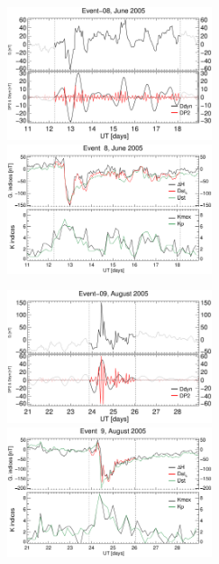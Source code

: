 \documentclass[a4paper,fleqn]{cas-dc}
\begin{document}
\begin{figure}[h!]
     \centerline{\Large \bf   
      \hspace{0.275\textwidth}  \color{black}{}
       \hspace{0.295\textwidth}  \color{black}{}
         \hfill}
	\includegraphics[width=6.0cm]{images/diono/iono_PI_V1_2005-06-11.eps}     
	\includegraphics[width=6.0cm]{images/dH_approx/diono_valid_V4_2005-06-11.eps}     
       \centerline{\Large \bf   
      \hspace{0.275\textwidth}  \color{black}{}
       \hspace{0.295\textwidth}  \color{black}{}
         \hfill}
	\includegraphics[width=6.0cm]{images/diono/iono_PI_V1_2005-08-21.eps}   
    \includegraphics[width=6.0cm]{images/dH_approx/diono_valid_V4_2005-08-21.eps}     


\end{figure}
\end{document}
